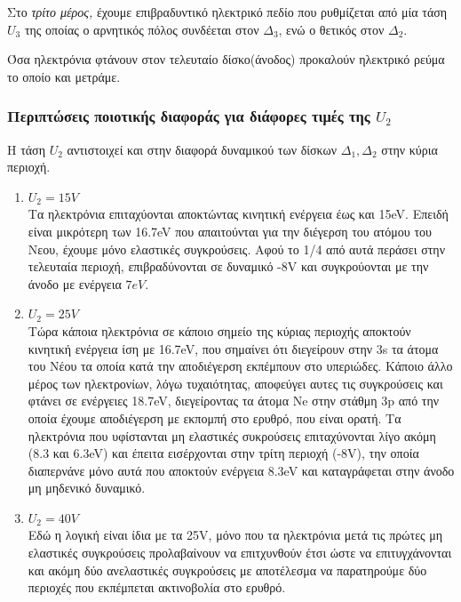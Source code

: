 \documentclass[a4paper]{article}
\begin{document}
	Στο \textit{τρίτο μέρος,} έχουμε επιβραδυντικό ηλεκτρικό πεδίο που ρυθμίζεται από μία τάση $U_3$ της οποίας ο αρνητικός πόλος συνδέεται στον $\Delta_3$, ενώ ο θετικός στον $\Delta_2$. 
	
	Όσα ηλεκτρόνια φτάνουν στον τελευταίο δίσκο(άνοδος) προκαλούν ηλεκτρικό ρεύμα το οποίο και μετράμε.
	
	\subsubsection*{Περιπτώσεις ποιοτικής διαφοράς για διάφορες τιμές της $U_2$}
	Η τάση $U_2$ αντιστοιχεί και στην διαφορά δυναμικού των δίσκων $\Delta_1,\Delta_2$ στην κύρια περιοχή.\\
	\begin{enumerate}
		\item \underline{$U_2=15V$}\\
			Τα ηλεκτρόνια επιταχύονται αποκτώντας κινητική ενέργεια έως και 15eV. Επειδή είναι μικρότερη των 16.7eV που απαιτούνται για την διέγερση του ατόμου του Νεου, έχουμε μόνο ελαστικές συγκρούσεις. Αφού το 1/4 από αυτά περάσει στην τελευταία περιοχή, επιβραδύνονται σε δυναμικό -8V και συγκρούονται με την άνοδο με ενέργεια $7eV$.
			
		\item \underline{$U_2 = 25V $} \\ 
			Τώρα κάποια ηλεκτρόνια σε κάποιο σημείο της κύριας περιοχής αποκτούν κινητική ενέργεια ίση με 16.7eV, που σημαίνει ότι διεγείρουν στην 3s τα άτομα του Νέου τα οποία κατά την αποδιέγερση εκπέμπουν στο υπεριώδες. Κάποιο άλλο μέρος των ηλεκτρονίων, λόγω τυχαιότητας, αποφεύγει αυτες τις συγκρούσεις και φτάνει σε ενέργειες 18.7eV, διεγείροντας τα άτομα Ne στην στάθμη 3p από την οποία έχουμε αποδιέγερση με εκπομπή στο ερυθρό, που είναι ορατή. Τα ηλεκτρόνια που υφίστανται μη ελαστικές συκρούσεις επιταχύνονται λίγο ακόμη (8.3 και 6.3eV) και έπειτα εισέρχονται στην τρίτη περιοχή (-8V), την οποία διαπερνάνε μόνο αυτά που αποκτούν ενέργεια 8.3eV και καταγράφεται στην άνοδο μη μηδενικό δυναμικό. 
		
		\item \underline{$U_2=40V$}\\
		Εδώ η λογική είναι ίδια με τα 25V, μόνο που τα ηλεκτρόνια μετά τις πρώτες μη ελαστικές συγκρούσεις προλαβαίνουν να επιτχυνθούν έτσι ώστε να επιτυγχάνονται και ακόμη δύο ανελαστικές συγκρούσεις με αποτέλεσμα να παρατηρούμε δύο περιοχές που εκπέμπεται ακτινοβολία στο ερυθρό.
	\end{enumerate}
	
\end{document}
